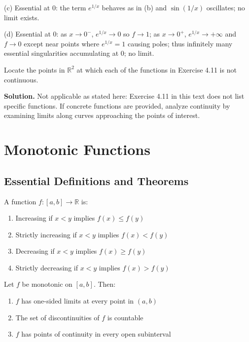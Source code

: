 (c) Essential at $0$: the term $e^{1/x}$ behaves as in (b) and $\sin(1/x)$ oscillates; no limit exists.

(d) Essential at $0$: as $x\to0^-$, $e^{1/x}\to0$ so $f\to 1$; as $x\to0^+$, $e^{1/x}\to+\infty$ and $f\to 0$ except near points where $e^{1/x}=1$ causing poles; thus infinitely many essential singularities accumulating at $0$; no limit.
\medskip

\begin{problembox}
Locate the points in $\mathbb{R}^2$ at which each of the functions in Exercise 4.11 is not continuous.
\end{problembox}

\noindent\textbf{Solution.}
Not applicable as stated here: Exercise 4.11 in this text does not list specific functions. If concrete functions are provided, analyze continuity by examining limits along curves approaching the points of interest.
\medskip

\section{Monotonic Functions}

\subsection*{Essential Definitions and Theorems}

\begin{definition}
A function $f: [a,b] \to \mathbb{R}$ is:
\begin{enumerate}
\item Increasing if $x < y$ implies $f(x) \leq f(y)$
\item Strictly increasing if $x < y$ implies $f(x) < f(y)$
\item Decreasing if $x < y$ implies $f(x) \geq f(y)$
\item Strictly decreasing if $x < y$ implies $f(x) > f(y)$
\end{enumerate}
\end{definition}

\begin{theorem}
Let $f$ be monotonic on $[a,b]$. Then:
\begin{enumerate}
\item $f$ has one-sided limits at every point in $(a,b)$
\item The set of discontinuities of $f$ is countable
\item $f$ has points of continuity in every open subinterval
\end{enumerate}
\end{theorem}

